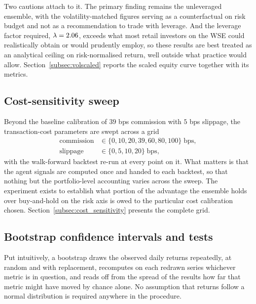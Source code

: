 Two cautions attach to it. The primary finding remains the unleveraged ensemble, with the volatility-matched figures serving as a counterfactual on risk budget and not as a recommendation to trade with leverage. And the leverage factor required, $\lambda = 2.06{}$, exceeds what most retail investors on the WSE could realistically obtain or would prudently employ, so these results are best treated as an analytical ceiling on risk-normalised return, well outside what practice would allow. Section~\ref{subsec:volscaled} reports the scaled equity curve together with its metrics.

\subsection{Cost-sensitivity sweep}\label{subsec:costsweep}

Beyond the baseline calibration of $39$ bps commission with $5$ bps slippage, the transaction-cost parameters are swept across a grid
\begin{equation}
\begin{aligned}
\mathrm{commission} &\in \{0, 10, 20, 39, 60, 80, 100\}\;\text{bps}, \\
\mathrm{slippage} &\in \{0, 5, 10, 20\}\;\text{bps},
\end{aligned}
\label{eq:cost_grid}
\end{equation}
with the walk-forward backtest re-run at every point on it. What matters is that the agent signals are computed once and handed to each backtest, so that nothing but the portfolio-level accounting varies across the sweep. The experiment exists to establish what portion of the advantage the ensemble holds over buy-and-hold on the risk axis is owed to the particular cost calibration chosen. Section~\ref{subsec:cost_sensitivity} presents the complete grid.

\subsection{Bootstrap confidence intervals and tests}\label{subsec:bootstrap}

Put intuitively, a bootstrap draws the observed daily returns repeatedly, at random and with replacement, recomputes on each redrawn series whichever metric is in question, and reads off from the spread of the results how far that metric might have moved by chance alone. No assumption that returns follow a normal distribution is required anywhere in the procedure.

